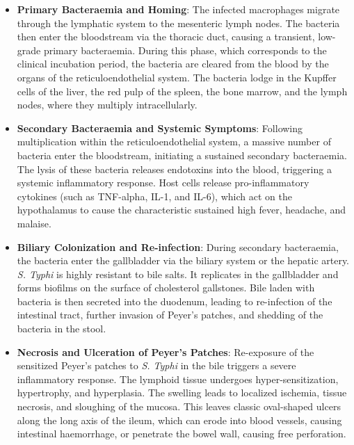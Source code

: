\begin{itemize}
  \item \textbf{Primary Bacteraemia and Homing}: The infected macrophages migrate through the lymphatic system to the mesenteric lymph nodes. The bacteria then enter the bloodstream via the thoracic duct, causing a transient, low-grade primary bacteraemia. During this phase, which corresponds to the clinical incubation period, the bacteria are cleared from the blood by the organs of the reticuloendothelial system. The bacteria lodge in the Kupffer cells of the liver, the red pulp of the spleen, the bone marrow, and the lymph nodes, where they multiply intracellularly.
  \item \textbf{Secondary Bacteraemia and Systemic Symptoms}: Following multiplication within the reticuloendothelial system, a massive number of bacteria enter the bloodstream, initiating a sustained secondary bacteraemia. The lysis of these bacteria releases endotoxins into the blood, triggering a systemic inflammatory response. Host cells release pro-inflammatory cytokines (such as TNF-alpha, IL-1, and IL-6), which act on the hypothalamus to cause the characteristic sustained high fever, headache, and malaise.
  \item \textbf{Biliary Colonization and Re-infection}: During secondary bacteraemia, the bacteria enter the gallbladder via the biliary system or the hepatic artery. \textit{S. Typhi} is highly resistant to bile salts. It replicates in the gallbladder and forms biofilms on the surface of cholesterol gallstones. Bile laden with bacteria is then secreted into the duodenum, leading to re-infection of the intestinal tract, further invasion of Peyer's patches, and shedding of the bacteria in the stool.
  \item \textbf{Necrosis and Ulceration of Peyer's Patches}: Re-exposure of the sensitized Peyer's patches to \textit{S. Typhi} in the bile triggers a severe inflammatory response. The lymphoid tissue undergoes hyper-sensitization, hypertrophy, and hyperplasia. The swelling leads to localized ischemia, tissue necrosis, and sloughing of the mucosa. This leaves classic oval-shaped ulcers along the long axis of the ileum, which can erode into blood vessels, causing intestinal haemorrhage, or penetrate the bowel wall, causing free perforation.
\end{itemize}

